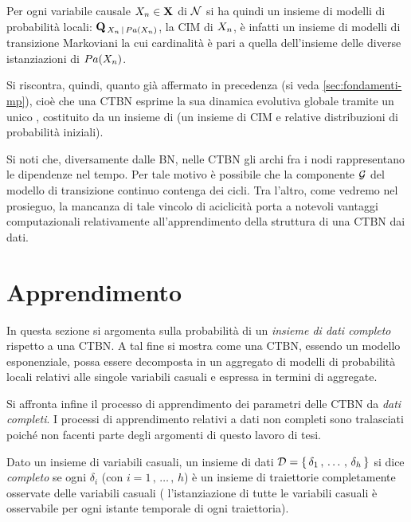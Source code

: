 Per ogni variabile causale $\mathnormal{X_n} \in \mathbf{X}$ di $\mathcal{N}$ si ha quindi un insieme di modelli di probabilità locali: $\mathbf{Q}_{\,\mathnormal{X_n}\,\arrowvert\,Pa(\mathnormal{X_n})}$, la \acs{CIM} di $\mathnormal{X_n}$, è infatti un insieme di modelli di transizione Markoviani la cui cardinalità è pari a quella dell'insieme delle diverse istanziazioni di $Pa(\mathnormal{X_n})$.

Si riscontra, quindi, quanto già affermato in precedenza (si veda \ref{sec:fondamenti-mp}), cioè che una \acs{CTBN} esprime la sua dinamica evolutiva globale tramite un unico \mprocess*{} \omog*{}, costituito da un insieme di \mprocess{} \cond{} (un insieme di \acs{CIM} e relative distribuzioni di probabilità iniziali).

Si noti che, diversamente dalle \acl{BN}, nelle \acl{CTBN} gli archi fra i nodi rappresentano le dipendenze nel tempo. Per tale motivo è possibile che la componente $\mathcal{G}$ del modello di transizione continuo contenga dei cicli. Tra l'altro, come vedremo nel prosieguo, la mancanza di tale vincolo di aciclicità porta a notevoli vantaggi computazionali relativamente all'apprendimento della struttura di una \acs{CTBN} dai dati.

\section{Apprendimento}
\label{sec:ctbn-apprendimento}
In questa sezione si argomenta sulla probabilità di un \emph{insieme di dati completo} rispetto a una \acl{CTBN}. A tal fine si mostra come una \acs{CTBN}, essendo un modello esponenziale, possa essere decomposta in un aggregato di modelli di probabilità locali relativi alle singole variabili casuali e espressa in termini di \emph{\stats{}} aggregate.

Si affronta infine il processo di apprendimento dei parametri delle \acl{CTBN} da \emph{dati completi}. I processi di apprendimento relativi a dati non completi sono tralasciati poiché non facenti parte degli argomenti di questo lavoro di tesi.

\begin{definizione}
\label{defn:dataset-completo}
Dato un insieme di variabili casuali, un insieme di dati $\mathcal{D}=\{\,\delta_1\,,\,\dotsc\,,\,\delta_h\,\}$ si dice \emph{completo} se ogni $\delta_i$ (con $i=1\,,\,\dotsc\,,\,h$) è un insieme di traiettorie completamente osservate delle variabili casuali (\ie{} l'istanziazione di tutte le variabili casuali è osservabile per ogni istante temporale di ogni traiettoria).
\end{definizione}


